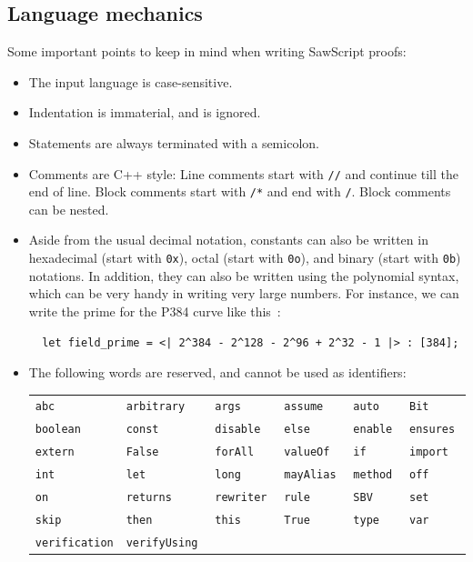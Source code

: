\documentclass[12pt]{galois-whitepaper}
\newcommand{\sawScript}{{\sc SawScript}\xspace}
\begin{document}
\subsection{Language mechanics}
Some important points to keep in mind when writing \sawScript proofs:
\begin{itemize}
\item The input language is case-sensitive.
\item Indentation is immaterial, and is ignored.
\item Statements are always terminated with a semicolon.
\item Comments are C++ style: Line comments start with {\tt //} and continue till the end of line. Block
comments start with {\tt /*} and end with {\tt */}. Block comments can be nested.
\item Aside from the usual decimal notation, constants can also be written in hexadecimal (start with {\tt 0x}), octal (start with {\tt 0o}),
and binary (start with {\tt 0b}) notations. In addition,
they can also be written using the polynomial syntax, which can be very handy in writing very large numbers.
For instance, we can write the prime for the P384 curve like this~\cite[Section 2.8.1]{sec2}:
\begin{Verbatim}
  let field_prime = <| 2^384 - 2^128 - 2^96 + 2^32 - 1 |> : [384];
\end{Verbatim}
\item The following words are reserved, and cannot be used as identifiers:

\begin{tabular}{llllll}
{\tt abc         } & {\tt arbitrary   } & {\tt args        } & {\tt assume      } & {\tt auto        } & {\tt Bit         } \\
{\tt boolean     } & {\tt const       } & {\tt disable     } & {\tt else        } & {\tt enable      } & {\tt ensures     } \\
{\tt extern      } & {\tt False       } & {\tt forAll      } & {\tt valueOf     } & {\tt if          } & {\tt import      } \\
{\tt int         } & {\tt let         } & {\tt long        } & {\tt mayAlias    } & {\tt method      } & {\tt off         } \\
{\tt on          } & {\tt returns     } & {\tt rewriter    } & {\tt rule        } & {\tt SBV         } & {\tt set         } \\
{\tt skip        } & {\tt then        } & {\tt this        } & {\tt True        } & {\tt type        } & {\tt var         } \\
{\tt verification} & {\tt verifyUsing } 
\end{tabular}


\end{itemize}
\end{document}
